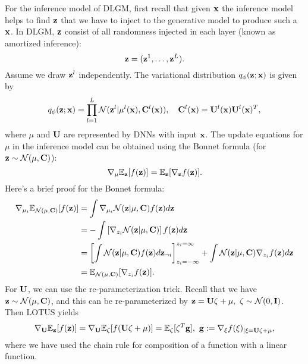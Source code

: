 \documentclass[../main.tex]{subfiles}
\begin{document}
\par For the inference model of DLGM, first recall that given ${\bf x}$ the inference model helps to find ${\bf z}$ that we have to inject to the generative model to produce such a ${\bf x}$. In DLGM, ${\bf z}$ consist of all randomness injected in each layer (known as amortized inference):
\begin{equation*}
{\bf z} =({\bf z}^1,\dots,{\bf z}^L).
\end{equation*}
Assume we draw ${\bf z}^l$ independently. The variational distribution $q_\phi({\bf z};{\bf x})$ is given by
\begin{equation*}
q_\phi({\bf z};{\bf x})=\prod_{l=1}^{L}\mathcal{N}({\bf z}^l|\mu^l({\bf x}),{\bf C}^l({\bf x})),\quad {\bf C}^l({\bf x})={\bf U}^l({\bf x}){\bf U}^l({\bf x})^T,
\end{equation*}
where $\mu$ and $\bf U$ are represented by DNNs with input $\bf x$. The update equations for $\mu$ in the inference model can be obtained using the Bonnet formula (for ${\bf z}\sim \mathcal{N}(\mu,{\bf C})$):
\begin{equation*}
\nabla_\mu\mathbb{E}_{\bf z}[f({\bf z})]=\mathbb{E}_{\bf z}[\nabla_{\bf z} f({\bf z})].
\end{equation*}
Here's a brief proof for the Bonnet formula:
\begin{align*}
\nabla_{\mu_i}\mathbb{E}_{\mathcal{N}(\mu,{\bf C})}[f({\bf z})] &= \int  \nabla_{\mu_i} \mathcal{N}({\bf z}|\mu,{\bf C}) f({\bf z}) d{\bf z}\\
&=-\int \left[\nabla_{z_i}\mathcal{N}({\bf z}|\mu,{\bf C})\right] f({\bf z}) d{\bf z}\\
&=\left[\int\mathcal{N}({\bf z}|\mu,{\bf C}) f({\bf z}) d{\bf z}_{\neg i} \right]_{z_i=-\infty}^{z_i=\infty}+ \int \mathcal{N}({\bf z}|\mu,{\bf C}) \nabla_{z_i} f({\bf z}) d{\bf z}\\
&=\mathbb{E}_{\mathcal{N}(\mu,{\bf C})}[\nabla_{z_i}f({\bf z})].
\end{align*}
For ${\bf U}$, we can use the re-parameterization trick. Recall that we have ${\bf z}\sim \mathcal{N}(\mu,{\bf C})$, and this can be re-parameterized by ${\bf z}={\bf U}\zeta +\mu,\ \zeta\sim\mathcal{N}(0,{\bf I})$. Then LOTUS yields
\begin{equation*}
\nabla_{\bf U}\mathbb{E}_{\bf z}[f({\bf z})]=\nabla_{\bf U}\mathbb{E}_\zeta[f({\bf U}\zeta +\mu)]=\mathbb{E}_\zeta[\zeta^T{\bf g}],\ {\bf g}:=\nabla_\xi f(\xi)_{|\xi={\bf U}\zeta+\mu},
\end{equation*}
where we have used the chain rule for composition of a function with a linear function.
\end{document}
